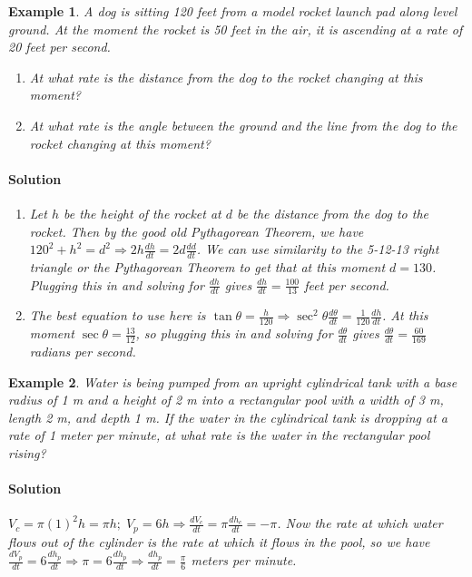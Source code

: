 \documentclass[letterpaper, 11pt, openany]{book}
\theoremstyle{mytheoremstyle}
\theoremstyle{myexamplestyle}
\newtheorem{example}{Example}[section]
\newenvironment{solution}{\paragraph{\sffamily \smaller \fontseries{b}\selectfont Solution}}{\hfill\faSquare}
\begin{document}
\begin{example}\label{e:rel-rates-dog}
    A dog is sitting 120 feet from a model rocket launch pad along level ground. At the moment the rocket is 50 feet in the air, it is ascending at a rate of 20 feet per second.
    \begin{enumerate}
        \item At what rate is the distance from the dog to the rocket changing at this moment?
        \item At what rate is the angle between the ground and the line from the dog to the rocket changing at this moment?
    \end{enumerate}
    \begin{solution}
        \begin{enumerate}
            \item Let \(h\) be the height of the rocket at \(d\) be the distance from the dog to the rocket. Then by the good old Pythagorean Theorem, we have \(120^2 + h^2 = d^2 \Rightarrow 2h \frac{dh}{dt} = 2d \frac{dd}{dt}\). We can use similarity to the 5-12-13 right triangle or the Pythagorean Theorem to get that at this moment \(d=130\). Plugging this in and solving for \(\frac{dh}{dt}\) gives \(\frac{dh}{dt} = \frac{100}{13}\) feet per second.
            \item The best equation to use here is \(\tan \theta = \frac{h}{120} \Rightarrow \sec^2 \theta \frac{d\theta}{dt} = \frac{1}{120} \frac{dh}{dt}\). At this moment \(\sec \theta = \frac{13}{12}\), so plugging this in and solving for \(\frac{d\theta}{dt}\) gives \(\frac{d\theta}{dt} = \frac{60}{169}\) radians per second.
        \end{enumerate}
    \end{solution}
\end{example}

\begin{example}
    Water is being pumped from an upright cylindrical tank with a base radius of 1 m and a height of 2 m into a rectangular pool with a width of 3 m, length 2 m, and depth 1 m. If the water in the cylindrical tank is dropping at a rate of 1 meter per minute, at what rate is the water in the rectangular pool rising?

    \begin{solution}
        \(V_{c} = \pi (1)^2 h = \pi h; \; V_{p} = 6h \Rightarrow \frac{dV_c}{dt} = \pi \frac{dh_c}{dt} = -\pi\). Now the rate at which water flows out of the cylinder is the rate at which it flows in the pool, so we have \(\frac{dV_p}{dt} = 6 \frac{dh_p}{dt} \Rightarrow \pi = 6 \frac{dh_p}{dt} \Rightarrow \frac{dh_p}{dt} = \frac{\pi}{6}\) meters per minute.
    \end{solution}
\end{example}
\end{document}
